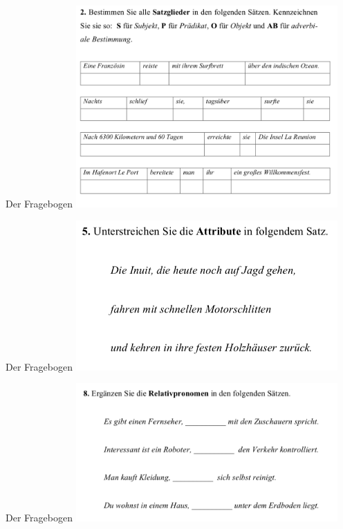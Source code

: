 \begin{frame}
  {Der Fragebogen}
  \pause
  \centering
  \includegraphics[width=0.75\textwidth]{graphics/02}
\end{frame}

\begin{frame}
  {Der Fragebogen}
  \pause
  \centering
  \includegraphics[width=0.75\textwidth]{graphics/03}
\end{frame}

\begin{frame}
  {Der Fragebogen}
  \pause
  \centering
  \includegraphics[width=0.75\textwidth]{graphics/04}
\end{frame}

